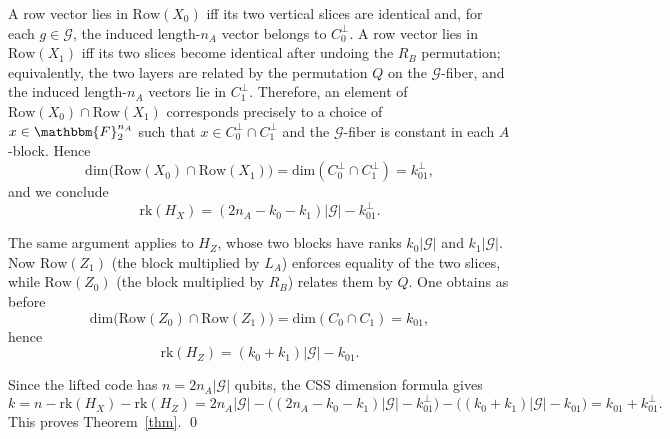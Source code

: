 \documentclass[a4paper,onecolumn,11pt]{quantumarticle}
\def\G{\mathcal{G}}
\def\F{\mathbbm{F}}
\def\dim{\mbox{dim}}
\def\Row{\text{Row}}
\def\rk{\mbox{rk}}
\begin{document}
A row vector lies in $\Row(X_0)$ iff its two vertical slices are identical and, for each $g\in \G$, the induced length-$n_A$ vector belongs to $C^\perp_0$.
A row vector lies in $\Row(X_1)$ iff its two slices become identical after undoing the $R_B$ permutation; equivalently, the two layers are related by the permutation $Q$ on the $\G$-fiber, and the induced length-$n_A$ vectors lie in $C_1^\perp$.
Therefore, an element of $\Row(X_0)\cap\Row(X_1)$ corresponds precisely to a choice of $x\in \F_2^{n_A}$ such that $x\in C_0^\perp\cap C_1^\perp$ and the $\G$-fiber is constant in each $A$-block.
Hence
\[
\dim\bigl(\Row(X_0)\cap \Row(X_1)\bigr)=\dim(C_0^\perp\cap C_1^\perp)=k_{01}^\perp,
\]
and we conclude
\[
\rk(H_X)=(2n_A-k_0-k_1)|\G|-k_{01}^\perp.
\]


The same argument applies to $H_Z$, whose two blocks have ranks $k_0|\G|$ and $k_1|\G|$.
Now $\Row(Z_1)$ (the block multiplied by $L_A$) enforces equality of the two slices, while $\Row(Z_0)$ (the block multiplied by $R_B$) relates them by $Q$. One obtains as before
\[
\dim\bigl(\Row(Z_0)\cap \Row(Z_1)\bigr)=\dim(C_0\cap C_1)=k_{01},
\]
hence
\[
\rk(H_Z)=(k_0+k_1)|\G|-k_{01}.
\]

Since the lifted code has $n=2n_A|\G|$ qubits, the CSS dimension formula gives
\[
k=n-\rk(H_X)-\rk(H_Z)
=2n_A|\G|-\bigl((2n_A-k_0-k_1)|\G|-k_{01}^\perp\bigr)-\bigl((k_0+k_1)|\G|-k_{01}\bigr)
= k_{01}+k_{01}^\perp.
\]
This proves Theorem~\ref{thm}.
\qed
\end{document}
